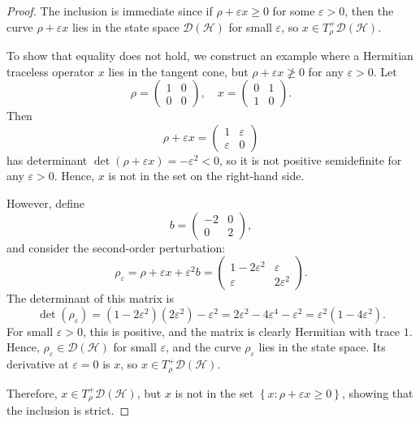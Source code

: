 \documentclass[10pt,a4paper]{amsart}
\newcommand{\lset}{\left\{ }
\newcommand{\rset}{\right\} }
\newcommand{\mc}{\mathcal}
\begin{document}
\begin{proof}
    The inclusion is immediate since if $\rho + \varepsilon x \geq 0$ for some $\varepsilon > 0$, then the curve $\rho + \varepsilon x$ lies in the state space $\mc D(\mc{H})$ for small $\varepsilon$, so $x \in T^+_\rho \mc D(\mc{H})$.
    
    To show that equality does not hold, we construct an example where a Hermitian traceless operator $x$ lies in the tangent cone, but $\rho + \varepsilon x \not\geq 0$ for any $\varepsilon > 0$.
    Let
    $$\rho = \begin{pmatrix} 1 & 0 \\ 0 & 0 \end{pmatrix}, \quad
    x = \begin{pmatrix} 0 & 1 \\ 1 & 0 \end{pmatrix}.$$
    Then
    $$\rho + \varepsilon x = \begin{pmatrix} 1 & \varepsilon \\ \varepsilon & 0 \end{pmatrix}$$
    has determinant $\det(\rho + \varepsilon x) = -\varepsilon^2 < 0$, so it is not positive semidefinite for any $\varepsilon > 0$. Hence, $x$ is not in the set on the right-hand side.
    
    However, define
    $$b = \begin{pmatrix} -2 & 0 \\ 0 & 2 \end{pmatrix},$$
    and consider the second-order perturbation:
    $$\rho_\varepsilon = \rho + \varepsilon x + \varepsilon^2 b = 
    \begin{pmatrix}
    1 - 2\varepsilon^2 & \varepsilon \\
    \varepsilon & 2\varepsilon^2
    \end{pmatrix}.$$
    The determinant of this matrix is
    $$\det(\rho_\varepsilon) = (1 - 2\varepsilon^2)(2\varepsilon^2) - \varepsilon^2 = 2\varepsilon^2 - 4\varepsilon^4 - \varepsilon^2 = \varepsilon^2(1 - 4\varepsilon^2).$$
    For small $\varepsilon > 0$, this is positive, and the matrix is clearly Hermitian with trace $1$. Hence, $\rho_\varepsilon \in \mc D(\mc{H})$ for small $\varepsilon$, and the curve $\rho_\varepsilon$ lies in the state space. Its derivative at $\varepsilon = 0$ is $x$, so $x \in T^+_\rho \mc D(\mc{H})$.
    
    Therefore, $x \in T^+_\rho \mc D(\mc{H})$, but $x$ is not in the set $\lset  x : \rho + \varepsilon x \geq 0 \rset $, showing that the inclusion is strict.
\end{proof}
\end{document}
